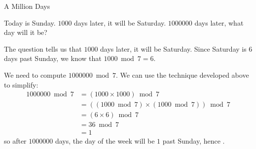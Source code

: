 \documentclass[a4paper,10pt]{report}
\begin{document}
\begin{problem}{A Million Days}

 Today is Sunday. $1000$ days later, it will be Saturday. $1000000$ days later,
 what day will it be?

 \begin{solution}

  The question tells us that $1000$ days later, it will be Saturday. Since
  Saturday is $6$ days past Sunday, we know that $1000 \bmod 7 = 6$.

  We need to compute $1000000 \bmod 7$. We can use the technique developed above
  to simplify: \begin{align*}
   1000000 \bmod 7
   &= (1000 \times 1000) \bmod 7 \\
   &= ((1000 \bmod 7) \times (1000 \bmod 7)) \bmod 7 \\
   &= (6 \times 6) \bmod 7 \\
   &= 36 \bmod 7 \\
   &= 1
  \end{align*}
  so after $1000000$ days, the day of the week will be $1$ past Sunday, hence
  .

 \end{solution}
\end{problem}
\end{document}
